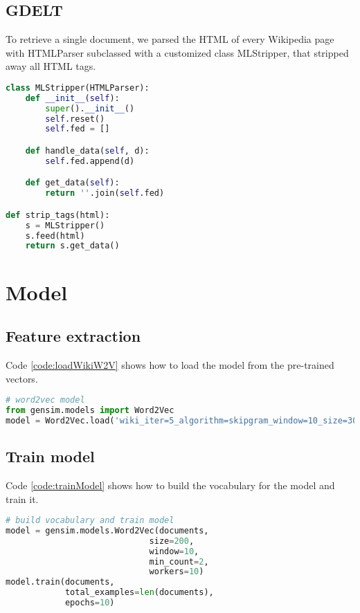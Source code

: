 \subsection{GDELT}
\label{appendix:MLStripper}
To retrieve a single document, we parsed the HTML of every Wikipedia page with HTMLParser subclassed with a customized class MLStripper, that stripped away all HTML tags.
\begin{lstlisting}[language=Python]
class MLStripper(HTMLParser):
    def __init__(self):
        super().__init__()
        self.reset()
        self.fed = []

    def handle_data(self, d):
        self.fed.append(d)

    def get_data(self):
        return ''.join(self.fed)

def strip_tags(html):
    s = MLStripper()
    s.feed(html)
    return s.get_data()

\end{lstlisting}

\section{Model}

\subsection{Feature extraction}
\label{appendix:loadWikiW2V}
Code \ref{code:loadWikiW2V} shows how to load the model from the pre-trained vectors.
\begin{lstlisting}[caption={How to load Wikipedia pre-trained model}, label={code:loadWikiW2V}, language=Python, breaklines=true, frame=single] 
# word2vec model
from gensim.models import Word2Vec
model = Word2Vec.load('wiki_iter=5_algorithm=skipgram_window=10_size=300_neg-samples=10.m')
\end{lstlisting}

\subsection{Train model}
\label{appendix:trainModel}
\begin{minipage}{\linewidth}
Code \ref{code:trainModel} shows how to build the vocabulary for the model and train it.
\begin{lstlisting}[caption={How to build vocabulary and train model}, label={code:trainModel}, language=Python, breaklines=true, frame=single] 
# build vocabulary and train model
model = gensim.models.Word2Vec(documents,
                             size=200,
                             window=10,
                             min_count=2,
                             workers=10)
model.train(documents, 
            total_examples=len(documents),
            epochs=10)
\end{lstlisting}
\end{minipage}

